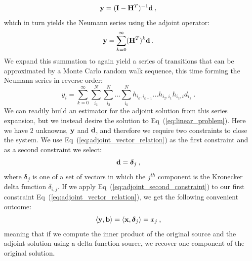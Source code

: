 \begin{equation}
  \mathbf{y} = (\mathbf{I} - \mathbf{H}^T)^{-1} \mathbf{d}\:,
  \label{eq:adjoint_split_system_2}
\end{equation}
which in turn yields the Neumann series using the adjoint operator:
\begin{equation}
  \mathbf{y} = \sum_{k=0}^{\infty} (\mathbf{H}^T)^k\mathbf{d}\:.
  \label{eq:adjoint_neumann_series}
\end{equation}
We expand this summation to again yield a series of transitions that
can be approximated by a Monte Carlo random walk sequence, this time
forming the Neumann series in reverse order:
\begin{equation}
  y_i = \sum_{k=0}^{\infty}\sum_{i_1}^{N}\sum_{i_2}^{N}\ldots
  \sum_{i_k}^{N}h_{i_k,i_{k-1}}\ldots h_{i_2,i_1} h_{i_1,i} d_{i_k}\:.
  \label{eq:adjoint_neumann_solution}
\end{equation}
We can readily build an estimator for the adjoint solution from this
series expansion, but we instead desire the solution to
Eq~(\ref{eq:linear_problem}). Here we have 2 unknowns, $\mathbf{y}$ and
$\mathbf{d}$, and therefore we require two constraints to close the
system. We use Eq~(\ref{eq:adjoint_vector_relation}) as the first
constraint and as a second constraint we select:
\begin{equation}
  \mathbf{d} = \boldsymbol{\delta}_j\:,
  \label{eq:adjoint_second_constraint}
\end{equation}
where $\boldsymbol{\delta}_j$ is one of a set of vectors in which the
$j^{th}$ component is the Kronecker delta function $\delta_{i,j}$. If
we apply Eq~(\ref{eq:adjoint_second_constraint}) to our first
constraint Eq~(\ref{eq:adjoint_vector_relation}), we get the following
convenient outcome:
\begin{equation}
  \langle \mathbf{y}, \mathbf{b} \rangle = \langle \mathbf{x},
  \boldsymbol{\delta}_j \rangle = x_j \:,
  \label{eq:inner_product_constraint}
\end{equation}
meaning that if we compute the inner product of the original source
and the adjoint solution using a delta function source, we recover one
component of the original solution.

